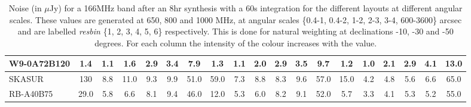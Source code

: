\begin{table}[!htp]
{{\begin{tabular}{|lcccccc||cccccc||cccccc|}
W9-0A72B120 & 1.4 \cellcolor{blue!18.00} & 1.1 \cellcolor{red!18.54} & 1.6 \cellcolor{green!18.44} & 2.9 \cellcolor{orange!20.47} & 3.4 \cellcolor{purple!19.85} & 7.9 \cellcolor{blue!18.77} & 1.3 \cellcolor{blue!18.07} & 1.1 \cellcolor{red!18.73} & 2.0 \cellcolor{green!19.20} & 2.9 \cellcolor{orange!20.90} & 3.5 \cellcolor{purple!19.97} & 9.7 \cellcolor{blue!18.53} & 1.2 \cellcolor{blue!18.30} & 1.0 \cellcolor{red!18.39} & 2.1 \cellcolor{green!20.90} & 2.9 \cellcolor{orange!20.90} & 4.1 \cellcolor{purple!28.18} & 13.0 \cellcolor{blue!18.79}\\ \hline 
SKASUR & 130 \cellcolor{blue!60.00} & 8.8 \cellcolor{red!60.00} & 11.0 \cellcolor{green!60.00} & 9.3 \cellcolor{orange!60.00} & 9.9 \cellcolor{purple!60.00} & 51.0 \cellcolor{blue!60.00} & 59.0 \cellcolor{blue!60.00} & 7.3 \cellcolor{red!60.00} & 8.8 \cellcolor{green!60.00} & 8.3 \cellcolor{orange!60.00} & 9.6 \cellcolor{purple!60.00} & 57.0 \cellcolor{blue!60.00} & 15.0 \cellcolor{blue!60.00} & 4.2 \cellcolor{red!60.00} & 4.8 \cellcolor{green!60.00} & 5.6 \cellcolor{orange!60.00} & 6.6 \cellcolor{purple!60.00} & 65.0 \cellcolor{blue!60.00}\\ \hline 
RB-A40B75 & 29.0 \cellcolor{blue!27.01} & 5.8 \cellcolor{red!43.85} & 6.6 \cellcolor{green!40.55} & 8.1 \cellcolor{orange!52.59} & 9.4 \cellcolor{purple!56.91} & 46.0 \cellcolor{blue!55.22} & 12.0 \cellcolor{blue!25.85} & 5.3 \cellcolor{red!46.69} & 6.0 \cellcolor{green!43.20} & 8.2 \cellcolor{orange!59.28} & 9.1 \cellcolor{purple!56.72} & 52.0 \cellcolor{blue!55.62} & 5.7 \cellcolor{blue!31.90} & 3.3 \cellcolor{red!48.30} & 4.1 \cellcolor{green!49.86} & 5.3 \cellcolor{orange!55.66} & 5.2 \cellcolor{purple!42.18} & 55.0 \cellcolor{blue!52.08}\tabularnewline \hline 
\end{tabular}}\hfill 

\caption{Noise (in $\mu$Jy) for a 166MHz band after an 8hr synthesis with a 60s integration for the different layouts at different angular scales. These values are generated at 650, 800 and 1000 MHz, at angular scales \{0.4-1, 0.4-2, 1-2, 2-3, 3-4, 600-3600\} arcsec and are labelled {\it resbin} \{1, 2, 3, 4, 5, 6\} respectively. This is done for natural weighting at declinations -10, -30 and -50 degrees. For each column the intensity of the colour increases with the value.}\label{tab:noise166-new}}
 \end{table}
